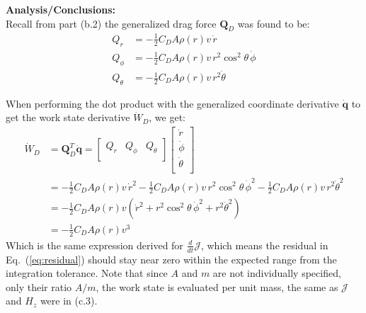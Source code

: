 \documentclass[titlepage]{article}
\begin{document}
\textbf{Analysis/Conclusions:}\\

Recall from part (b.2) the generalized drag force $\boldsymbol{Q}_D$ was found to be:
\begin{equation}
	\begin{split}
		Q_r&=-\frac{1}{2}C_DA\rho(r)v\,\dot{r} \\
		Q_\phi&=-\frac{1}{2}C_DA\rho(r)v\,r^2\cos^2\theta\,\dot{\phi} \\
		Q_\theta&=-\frac{1}{2}C_DA\rho(r)v\,r^2\dot{\theta}
	\end{split}
\end{equation}

When performing the dot product with the generalized coordinate derivative $\dot{\boldsymbol{q}}$ to get the work state derivative $\dot{W}_D$, we get:
\begin{equation}
	\begin{split}
		\dot{W}_D&=\boldsymbol{Q}_D^T\dot{\boldsymbol{q}}=
		\begin{bmatrix}
			Q_r & Q_\phi & Q_\theta \\
		\end{bmatrix}
		\begin{bmatrix}
			\dot{r} \\
			\dot{\phi} \\
			\dot{\theta} \\
		\end{bmatrix} \\
		&=-\frac{1}{2}C_DA\rho(r)v\,\dot{r}^2-\frac{1}{2}C_DA\rho(r)v\,r^2\cos^2\theta\,\dot{\phi}^2-\frac{1}{2}C_DA\rho(r)v\,r^2\dot{\theta}^2 \\
		&=-\frac{1}{2}C_DA\rho(r)v\left(\dot{r}^2+r^2\cos^2\theta\,\dot{\phi}^2+r^2\dot{\theta}^2\right) \\
		&=-\frac{1}{2}C_DA\rho(r)v^3
	\end{split}
\end{equation}
Which is the same expression derived for $\frac{d}{dt}\mathcal{J}$, which means the residual in Eq.~(\ref{eq:residual}) should stay near zero within the expected range from the integration tolerance. Note that since $A$ and $m$ are not individually specified, only their ratio $A/m$, the work state is evaluated per unit mass, the same as $\mathcal{J}$ and $H_z$ were in (c.3).\\

\newpage
\end{document}
